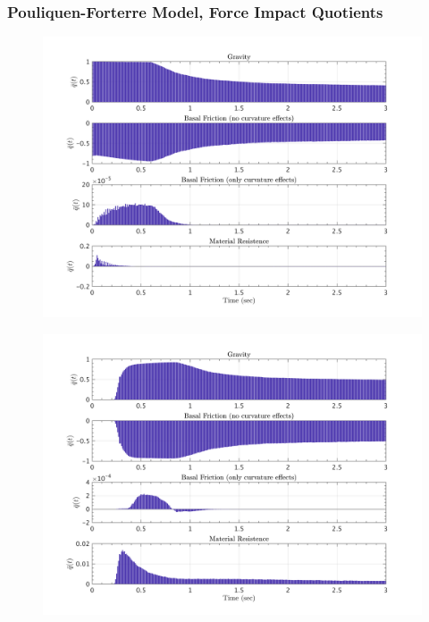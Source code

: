 \documentclass{article}
\begin{document}
\subsubsection{Pouliquen-Forterre Model, Force  Impact Quotients}
\begin{figure}[H]
        \begin{minipage}[b]{0.5\linewidth}
                \centering
                \includegraphics[width=1\textwidth]{InclinedPlane/LocalRecords/ContribF1_P_x.png}
                \label{fig:Ramp-Px1}
        \end{minipage}
        \begin{minipage}[b]{0.5\linewidth}
                \centering
                \includegraphics[width=1\textwidth]{InclinedPlane/LocalRecords/ContribF8_P_x.png}
                \label{fig:Ramp-Px2}
        \end{minipage}


\end{figure}
\end{document}
